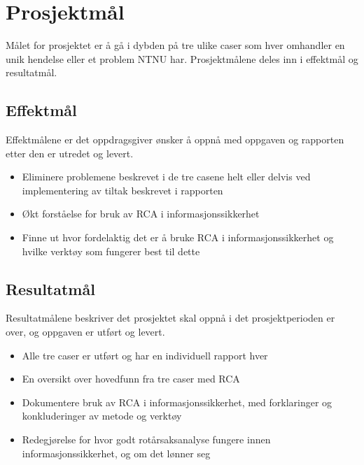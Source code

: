 \section{Prosjektmål}
\label{sec:prosjektmaal}
Målet for prosjektet er å gå i dybden på tre ulike caser som hver omhandler en unik hendelse eller et problem NTNU har. Prosjektmålene deles inn i effektmål og resultatmål.

\subsection{Effektmål}
Effektmålene er det oppdragsgiver ønsker å oppnå med oppgaven og rapporten etter den er utredet og levert.
\begin{itemize}
    \item Eliminere problemene beskrevet i de tre casene helt eller delvis ved implementering av tiltak beskrevet i rapporten
    \item Økt forståelse for bruk av RCA i informasjonssikkerhet
    \item Finne ut hvor fordelaktig det er å bruke RCA i informasjonssikkerhet og hvilke verktøy som fungerer best til dette
\end{itemize}

\subsection{Resultatmål}
Resultatmålene beskriver det prosjektet skal oppnå i det prosjektperioden er over, og oppgaven er utført og levert.

\begin{itemize}
    \item Alle tre caser er utført og har en individuell rapport hver
    \item En oversikt over hovedfunn fra tre caser med RCA
    \item Dokumentere bruk av RCA i informasjonssikkerhet, med forklaringer og konkluderinger av metode og verktøy
    \item Redegjørelse for hvor godt rotårsaksanalyse fungere innen informasjonssikkerhet, og om det lønner seg
\end{itemize}